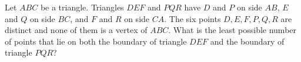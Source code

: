 Let $ABC$ be a triangle. Triangles $DEF$ and $PQR$ have $D$ and $P$ on side $AB$, $E$ and $Q$ on side $BC$, and $F$ and $R$ on side $CA$. The six points $D,E,F,P,Q,R$ are distinct and none of them is a vertex of $ABC$. What is the least possible number of points that lie on both the boundary of triangle $DEF$ and the boundary of triangle $PQR$?
